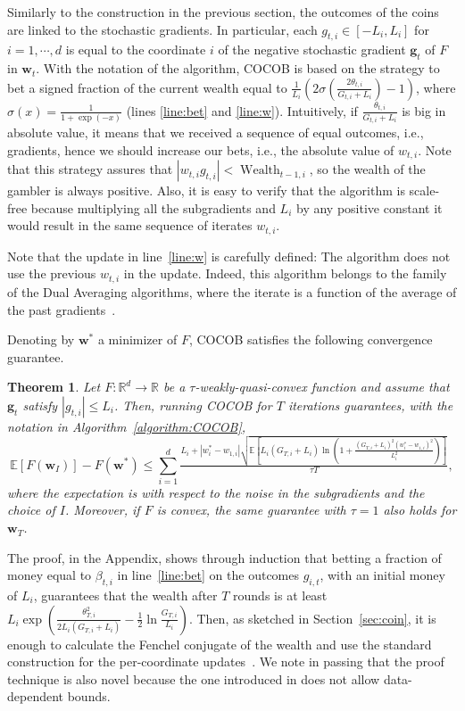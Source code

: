 \documentclass{article}
\newcommand{\bg}{\boldsymbol{g}}
\newcommand{\bw}{\boldsymbol{w}}
\DeclareMathOperator{\Wealth}{Wealth}
\newcommand{\field}[1]{\mathbb{#1}}
\newcommand{\R}{\field{R}}
\newcommand{\E}{\field{E}}
\newtheorem{theorem}{Theorem}
\begin{document}
Similarly to the construction in the previous section, the outcomes of the coins are linked to the stochastic gradients. In particular, each $g_{t,i}\in [-L_{i}, L_{i}]$ for $i=1,\cdots,d$ is equal to the coordinate $i$ of the negative stochastic gradient $\bg_t$ of $F$ in $\bw_t$.
With the notation of the algorithm, COCOB is based on the strategy to bet a signed fraction of the 
current wealth equal to $\tfrac{1}{L_i}\left(2\sigma\left(\tfrac{2\theta_{t,i}}{G_{t,i}+ L_{i}}\right)-1\right)$, 
where $\sigma(x)=\tfrac{1}{1+\exp(-x)}$ (lines \ref{line:bet} and \ref{line:w}).
Intuitively, if $\tfrac{\theta_{t,i}}{G_{t,i}+ L_{i}}$ is big in absolute value, it means that we received 
a sequence of equal outcomes, i.e., gradients, hence we should increase our bets, i.e., the absolute value of $w_{t,i}$. 
Note that this strategy assures that $|w_{t,i} g_{t,i}| < \Wealth_{t-1,i}$, so the wealth of the 
gambler is always positive. Also, it is easy to verify that the algorithm is scale-free because 
multiplying all the subgradients and $L_i$ by any positive constant it would result in the same sequence of iterates $w_{t,i}$.

Note that the update in line~\ref{line:w} is carefully defined: The algorithm does not use the previous 
$w_{t,i}$ in the update. Indeed, this algorithm belongs to the family of the Dual Averaging algorithms, 
where the iterate is a function of the average of the past gradients~\citep{Nesterov09}.

Denoting by $\bw^*$ a minimizer of $F$, COCOB satisfies the following convergence guarantee.
\begin{theorem}
\label{theo:main}
Let $F:\R^d \rightarrow \R$ be a $\tau$-weakly-quasi-convex function and assume that $\bg_t$ satisfy $|g_{t,i}|\leq L_i$.
Then, running COCOB for $T$ iterations guarantees, with the notation in Algorithm~\ref{algorithm:COCOB},
\[
\E[F\left(\bw_I\right)] - F(\bw^*) \leq \sum_{i=1}^d \tfrac{L_i+|w^*_i-w_{1,i}| \sqrt{ \E\left[L_i (G_{T,i} +L_i)\ln\left(1+ \tfrac{(G_{T,i}+L_i)^2 (w_i^*-w_{1,i})^2}{L_i^2}\right)\right]}}{\tau T},
\]
where the expectation is with respect to the noise in the subgradients and the choice of $I$.
Moreover, if $F$ is convex, the same guarantee with $\tau=1$ also holds for $\bw_T$.
\end{theorem}

The proof, in the Appendix, shows through induction that betting a fraction of money 
equal to $\beta_{t,i}$ in line~\ref{line:bet} on the outcomes $g_{i,t}$, with an initial 
money of $L_i$, guarantees that the wealth after $T$ rounds is at least 
$L_i \exp\left(\tfrac{\theta_{T,i}^2}{2 L_i (G_{T,i}+L_i)}-\tfrac{1}{2}\ln\tfrac{G_{T,i}}{L_i}\right)$. 
Then, as sketched in Section~\ref{sec:coin}, it is enough to calculate the Fenchel conjugate of the wealth and use the 
standard construction for the per-coordinate updates~\citep{StreeterM10}. We note in passing that the 
proof technique is also novel because the one introduced in \citet{OrabonaP16b} does not allow data-dependent bounds.
\end{document}
